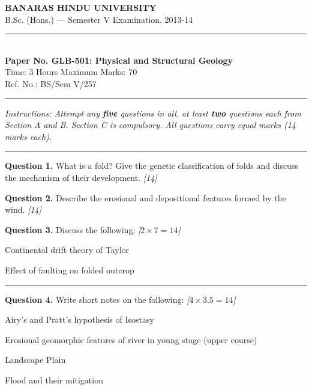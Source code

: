 \documentclass[11pt,a4paper]{article}
\newcommand{\pts}[1]{\hfill   \textit{[#1]}}
\begin{document}
\begin{center}
  {\large\bfseries BANARAS HINDU UNIVERSITY}\\[2pt]
  {\normalsize B.Sc. (Hons.) --- Semester V Examination, 2013-14}\\[6pt]
  \rule{0.8\linewidth}{0.5pt}\\[6pt]
  {\large\bfseries Paper No. GLB-501: Physical and Structural Geology}\\[4pt]
  {\normalsize Time: 3 Hours \hfill Maximum Marks: 70}\\[2pt]
  {\small Ref. No.: BS/Sem V/257}
\end{center}
\rule{\linewidth}{0.4pt}
\smallskip



\noindent   \textit{Instructions: Attempt any   \textbf{five} questions in all, at least   \textbf{two} questions each from Section A and B. Section C is compulsory. All questions carry equal marks (14 marks each).}
\bigskip

\bigskip


\rule{\linewidth}{0.4pt}\smallskip




\noindent   \textbf{Question 1.} What is a fold? Give the genetic classification of folds and discuss the mechanism of their development. \pts{14}

\medskip


\noindent   \textbf{Question 2.} Describe the erosional and depositional features formed by the wind. \pts{14}

\medskip


\noindent   \textbf{Question 3.} Discuss the following: \pts{$2  \times 7 = 14$}

\begin{parts}
  \item Continental drift theory of Taylor
  \item Effect of faulting on folded outcrop
\end{parts}

\bigskip


\rule{\linewidth}{0.4pt}\smallskip




\noindent   \textbf{Question 4.} Write short notes on the following: \pts{$4  \times 3.5 = 14$}

\begin{parts}
  \item Airy's and Pratt's hypothesis of Isostasy
  \item Erosional geomorphic features of river in young stage (upper course)
  \item Landscape Plain
  \item Flood and their mitigation
\end{parts}
\end{document}
